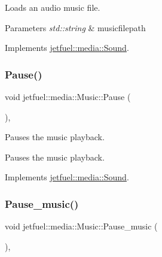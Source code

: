 Loads an audio music file.


\begin{DoxyParams}{Parameters}
{\em std\+::string} & musicfilepath \\
\hline
\end{DoxyParams}


Implements \hyperlink{classjetfuel_1_1media_1_1Sound_ab18ff9b8dd2001fa11b17649a6a3defb}{jetfuel\+::media\+::\+Sound}.

\mbox{\label{classjetfuel_1_1media_1_1Music_a002f31a60671c229bd054539caf537c5}} 
\subsubsection{\texorpdfstring{Pause()}{Pause()}}
{\footnotesize\ttfamily void jetfuel\+::media\+::\+Music\+::\+Pause (\begin{DoxyParamCaption}{ }\end{DoxyParamCaption})\hspace{0.3cm}{\ttfamily [override]}, {\ttfamily [virtual]}}



Pauses the music playback. 

Pauses the music playback. 

Implements \hyperlink{classjetfuel_1_1media_1_1Sound_adb9cd45e23e6224760051e579aeefa7f}{jetfuel\+::media\+::\+Sound}.

\mbox{\label{classjetfuel_1_1media_1_1Music_a16f346ddd22ce93c347f53f2f930d3fe}} 
\subsubsection{\texorpdfstring{Pause\+\_\+music()}{Pause\_music()}}
{\footnotesize\ttfamily void jetfuel\+::media\+::\+Music\+::\+Pause\+\_\+music (\begin{DoxyParamCaption}{ }\end{DoxyParamCaption})\hspace{0.3cm}{\ttfamily [inline]}, {\ttfamily [protected]}}



